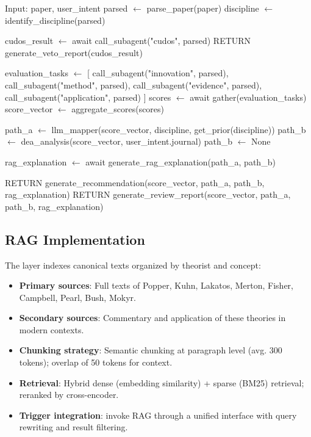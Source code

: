 \begin{algorithm}[H]
\caption{Router Orchestration}
\label{alg:router}
\begin{algorithmic}
\STATE Input: paper, user\_intent
\STATE parsed $\leftarrow$ parse\_paper(paper)
\STATE discipline $\leftarrow$ identify\_discipline(parsed)

\STATE cudos\_result $\leftarrow$ await call\_subagent("cudos", parsed)
    \STATE RETURN generate\_veto\_report(cudos\_result)
\ENDIF

\STATE evaluation\_tasks $\leftarrow$ [
    call\_subagent("innovation", parsed),
    call\_subagent("method", parsed),
    call\_subagent("evidence", parsed),
    call\_subagent("application", parsed)
]
\STATE scores $\leftarrow$ await gather(evaluation\_tasks)
\STATE score\_vector $\leftarrow$ aggregate\_scores(scores)

\STATE path\_a $\leftarrow$ llm\_mapper(score\_vector, discipline, get\_prior(discipline))
    \STATE path\_b $\leftarrow$ dea\_analysis(score\_vector, user\_intent.journal)
\ELSE
    \STATE path\_b $\leftarrow$ None
\ENDIF

    \STATE rag\_explanation $\leftarrow$ await generate\_rag\_explanation(path\_a, path\_b)
\ENDIF

    \STATE RETURN generate\_recommendation(score\_vector, path\_a, path\_b, rag\_explanation)
\ELSE
    \STATE RETURN generate\_review\_report(score\_vector, path\_a, path\_b, rag\_explanation)
\ENDIF
\end{algorithmic}
\end{algorithm}

\subsection{RAG Implementation}

The \rag{} layer indexes canonical texts organized by theorist and concept:

\begin{itemize}
    \item \textbf{Primary sources}: Full texts of Popper, Kuhn, Lakatos, Merton, Fisher, Campbell, Pearl, Bush, Mokyr.
    \item \textbf{Secondary sources}: Commentary and application of these theories in modern contexts.
    \item \textbf{Chunking strategy}: Semantic chunking at paragraph level (avg. 300 tokens); overlap of 50 tokens for context.
    \item \textbf{Retrieval}: Hybrid dense (embedding similarity) + sparse (BM25) retrieval; reranked by cross-encoder.
    \item \textbf{Trigger integration}: \subagents{} invoke RAG through a unified interface with query rewriting and result filtering.
\end{itemize}

